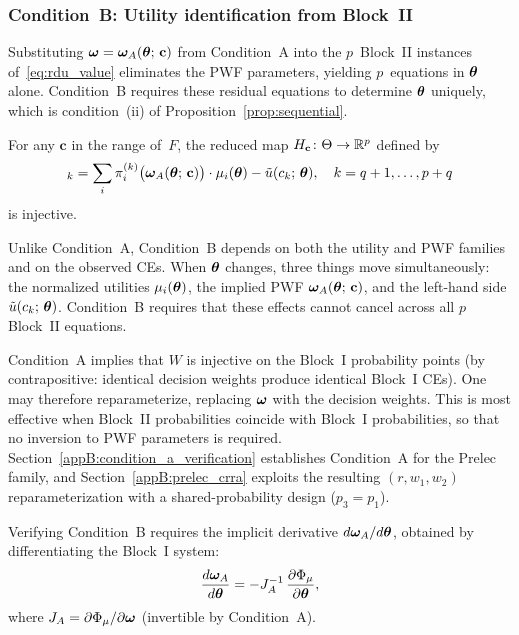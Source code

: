 \subsubsection{Condition~B: Utility identification from Block~II}
\label{appB:condition_b}

Substituting $\boldsymbol{\omega} = \boldsymbol{\omega}_A(\boldsymbol{\theta};\, \mathbf{c})$ from
Condition~A into the $p$~Block~II instances of~\eqref{eq:rdu_value}
eliminates the PWF parameters, yielding $p$~equations in
$\boldsymbol{\theta}$ alone. Condition~B requires these residual equations
to determine $\boldsymbol{\theta}$ uniquely, which is condition~(ii) of
Proposition~\ref{prop:sequential}.

\begin{condition}[B]
\label{cond:B}
For any $\mathbf{c}$ in the range of~$F$, the reduced map
$H_{\mathbf{c}} \colon \Theta \to \mathbb{R}^p$ defined by
\begin{equation}
    [H_{\mathbf{c}}(\bth)]_k
    = \sum_i \pi_i^{(k)}\bigl(\bomega_A(\bth;\, \mathbf{c})\bigr)
      \cdot \mu_i(\bth)
    - \tilde{u}(c_k;\, \bth),
    \quad k = q+1, \ldots, p+q
\end{equation}
is injective.
\end{condition}

Unlike Condition~A, Condition~B depends on both the utility and PWF
families and on the observed CEs. When $\boldsymbol{\theta}$ changes, three
things move simultaneously: the normalized utilities
$\mu_i(\boldsymbol{\theta})$, the implied PWF
$\boldsymbol{\omega}_A(\boldsymbol{\theta};\, \mathbf{c})$, and the left-hand side
$\tilde{u}(c_k;\, \boldsymbol{\theta})$. Condition~B requires that these
effects cannot cancel across all $p$ Block~II equations.

Condition~A implies that $W$ is injective on the Block~I
probability points (by contrapositive: identical decision weights
produce identical Block~I CEs). One may therefore reparameterize,
replacing $\boldsymbol{\omega}$ with the decision weights. This is most effective
when Block~II probabilities coincide with Block~I probabilities, so
that no inversion to PWF parameters is required.
Section~\ref{appB:condition_a_verification} establishes Condition~A for the
Prelec family, and Section~\ref{appB:prelec_crra} exploits the resulting
$(r, w_1, w_2)$ reparameterization with a shared-probability
design ($p_3 = p_1$).

Verifying Condition~B requires the implicit derivative
$d\boldsymbol{\omega}_A/d\boldsymbol{\theta}$, obtained by differentiating the Block~I
system:
\begin{equation}
    \frac{d\boldsymbol{\omega}_A}{d\boldsymbol{\theta}}
    = -J_A^{-1}\,
    \frac{\partial \Phi_\mu}{\partial \boldsymbol{\theta}},
    \label{eq:implicit_deriv}
\end{equation}
where $J_A = \partial \Phi_\mu / \partial \boldsymbol{\omega}$ (invertible by
Condition~A).

